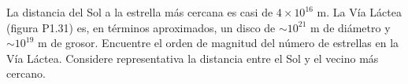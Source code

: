 \item La distancia del Sol a la estrella más cercana es casi de $4 \times 10^{16} \text{ m}$. La Vía Láctea (figura P1.31) es, en términos aproximados, un disco de $\sim 10^{21} \text{ m}$ de diámetro y $\sim 10^{19} \text{ m}$ de grosor. Encuentre el orden de magnitud del número de estrellas en la Vía Láctea. Considere representativa la distancia entre el Sol y el vecino más cercano.
